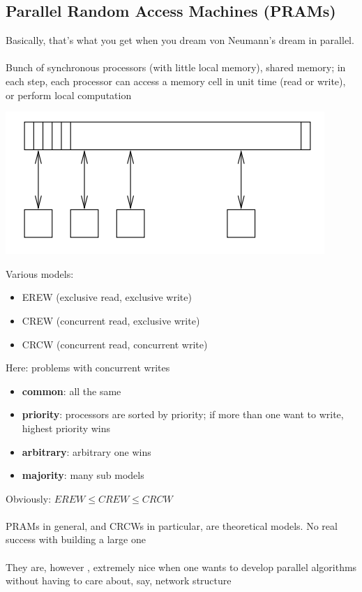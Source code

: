 \documentclass{article}[18pt]
\begin{document}
\subsection{Parallel Random Access Machines (PRAMs)}
Basically, that's what you get when you dream von Neumann's dream in parallel.\\
\\
Bunch of synchronous processors (with little local memory), shared memory; in each step, each processor can access a memory cell in unit time (read or write), or perform local computation
\begin{center}
	\includegraphics[scale=0.7]{pram}
\end{center}
Various models:
\begin{itemize}
	\item EREW (exclusive read, exclusive write)
	\item CREW (concurrent read, exclusive write)
	\item CRCW (concurrent read, concurrent write)
\end{itemize}
Here: problems with concurrent writes
\begin{itemize}
	\item \textbf{common}: all the same
	\item \textbf{priority}: processors are sorted by priority; if more than one want to write, highest priority wins
	\item \textbf{arbitrary}: arbitrary one wins
	\item \textbf{majority}: many sub models
\end{itemize}
Obviously: $EREW\leqslant CREW \leqslant CRCW$\\
\\
PRAMs in general, and CRCWs in particular, are theoretical models. No real success with building a large one\\
\\
They are, however , extremely nice when one wants to develop parallel algorithms without having to care about, say, network structure\\
\end{document}

